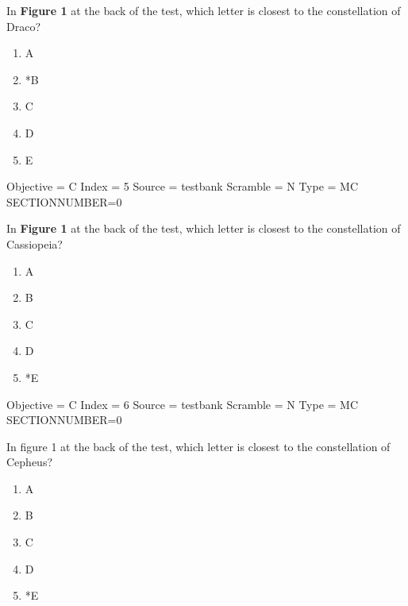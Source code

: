 \documentclass[11pt]{article}
\begin{document}
\begin{enumerate}
\begin{minipage}{\textwidth}
\begin{minipage}{\textwidth}
\item In {\bf Figure 1} at the back of the test, which letter is closest to the constellation of Draco?
\begin{multicols}{3}
\begin{enumerate} 
\setlength{\itemsep}{1pt} 
\setlength{\parskip}{0pt} 
\setlength{\parsep}{0pt}
\setlength{\multicolsep}{1pt} 
\item A
\item *B
\item C
\item D
\item E
\end{enumerate} 
\vfill 
\end{multicols}

Objective = C
Index = 5
Source = testbank
Scramble = N
Type = MC
SECTIONNUMBER=0
\end{minipage}
\end{minipage}
\vskip 0.20in

\begin{minipage}{\textwidth}
\begin{minipage}{\textwidth}
\item In {\bf Figure 1} at the back of the test, which letter is closest to the constellation of  Cassiopeia?
\begin{multicols}{3}
\begin{enumerate} 
\setlength{\itemsep}{1pt} 
\setlength{\parskip}{0pt} 
\setlength{\parsep}{0pt}
\setlength{\multicolsep}{1pt} 
\item A
\item B
\item C
\item D
\item *E
\end{enumerate} 
\vfill 
\end{multicols}

Objective = C
Index = 6
Source = testbank
Scramble = N
Type = MC
SECTIONNUMBER=0
\end{minipage}
\end{minipage}
\vskip 0.20in

\begin{minipage}{\textwidth}
\begin{minipage}{\textwidth}
\item In figure 1 at the back of the test, which letter is closest to the constellation of Cepheus?
\begin{multicols}{3}
\begin{enumerate} 
\setlength{\itemsep}{1pt} 
\setlength{\parskip}{0pt} 
\setlength{\parsep}{0pt}
\setlength{\multicolsep}{1pt} 
\item A
\item B
\item C
\item D
\item *E
\end{enumerate} 
\vfill 
\end{multicols}


\end{minipage}
\end{minipage}
\end{enumerate}
\end{document}
